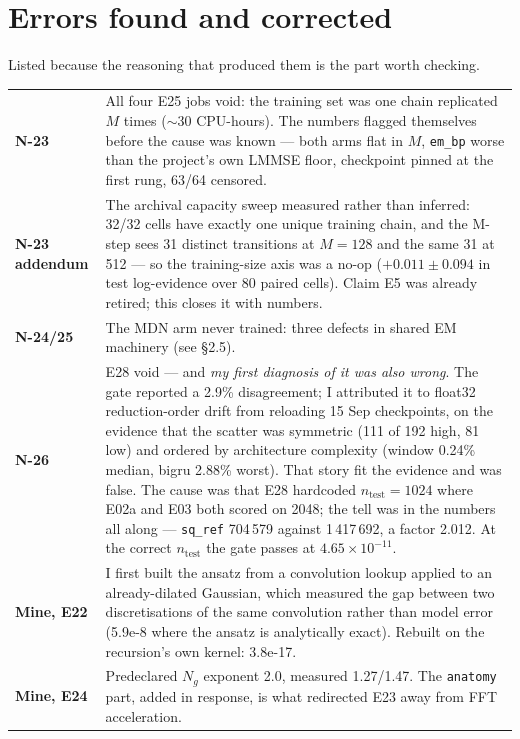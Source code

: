 \documentclass[10pt,a4paper]{article}
\newcommand{\nseq}{M}
\newcommand{\code}[1]{\texttt{\small #1}}
\newcommand{\st}[1]{\textbf{#1}}
\begin{document}
\section{Errors found and corrected}

Listed because the reasoning that produced them is the part worth checking.

\noindent\begin{tabular}{@{}l p{11.0cm}@{}}
\toprule
\st{N-23} & All four E25 jobs void: the training set was one chain replicated $\nseq$ times
($\sim$30 CPU-hours). The numbers flagged themselves before the cause was known --- both arms
flat in $\nseq$, \code{em\_bp} worse than the project's own LMMSE floor, checkpoint pinned at
the first rung, 63/64 censored. \\
\st{N-23 addendum} & The archival capacity sweep measured rather than inferred: 32/32 cells have
exactly one unique training chain, and the M-step sees 31 distinct transitions at $\nseq=128$ and
the same 31 at 512 --- so the training-size axis was a no-op ($+0.011\pm0.094$ in test
log-evidence over 80 paired cells). Claim E5 was already retired; this closes it with numbers. \\
\st{N-24/25} & The MDN arm never trained: three defects in shared EM machinery (see \S2.5). \\
\st{N-26} & E28 void --- and \emph{my first diagnosis of it was also wrong}. The gate reported a
2.9\% disagreement; I attributed it to float32 reduction-order drift from reloading 15 Sep
checkpoints, on the evidence that the scatter was symmetric (111 of 192 high, 81 low) and
ordered by architecture complexity (window 0.24\% median, bigru 2.88\% worst). That story fit
the evidence and was false. The cause was that E28 hardcoded $n_{\text{test}}=1024$ where E02a
and E03 both scored on 2048; the tell was in the numbers all along --- \code{sq\_ref} 704\,579
against 1\,417\,692, a factor 2.012. At the correct $n_{\text{test}}$ the gate passes at
$4.65\times10^{-11}$. \\
\st{Mine, E22} & I first built the ansatz from a convolution lookup applied to an
already-dilated Gaussian, which measured the gap between two discretisations of the same
convolution rather than model error (5.9e-8 where the ansatz is analytically exact). Rebuilt on
the recursion's own kernel: 3.8e-17. \\
\st{Mine, E24} & Predeclared $N_g$ exponent 2.0, measured 1.27/1.47. The \code{anatomy} part,
added in response, is what redirected E23 away from FFT acceleration. \\

\end{tabular}
\end{document}
